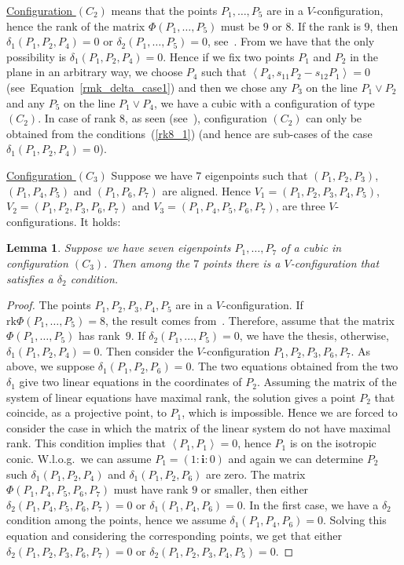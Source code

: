 \documentclass{amsart}
\theoremstyle{plain}
\newtheorem{lemma}{Lemma}[section]
\theoremstyle{definition}
\newcommand{\scl}[2]{\left\langle {#1}, {#2} \right\rangle}
\newcommand{\iii}{\textbf{i}}
\newcommand{\rk}{\ensuremath{\mathrm{rk}}}
\begin{document}
\underline{Configuration $(C_2)$} means that the points
$P_1, \dots, P_5$ are in a
$V$-configuration, hence the rank of the matrix $\Phi(P_1, \dots, P_5)$
must be $9$ or $8$. If the rank is $9$, then $\delta_1(P_1, P_2, P_4) = 0$
or $\delta_2(P_1, \dots, P_5) = 0$, see~.
From  we have that the only possibility
is $\delta_1(P_1, P_2, P_4) = 0$. Hence if we fix two points $P_1$ and $P_2$
in the plane in an arbitrary way, we choose $P_4$ such that
$\scl{P_4}{s_{11}P_2-s_{12}P_1}=0$
(see~Equation~\eqref{rmk_delta_case1}) and then we chose any $P_3$
on the line $P_1\vee P_2$ and any $P_5$ on the line $P_1\vee P_4$, we have a cubic
with a configuration of type $(C_2)$. In case of rank $8$, as seen
(see~),
configuration $(C_2)$ can only be
obtained from the conditions~(\ref{rk8_1}) (and hence are sub-cases
of the case $\delta_1(P_1, P_2, P_4)=0$).

\underline{Configuration $(C_3)$} Suppose we have $7$ eigenpoints such that
$(P_1, P_2, P_3)$, $(P_1, P_4, P_5)$ and $(P_1, P_6, P_7)$ are
aligned. Hence
$V_1 = (P_1, P_2, P_3, P_4, P_5)$, $V_2 = (P_1, P_2, P_3, P_6, P_7)$ and
$V_3 = (P_1, P_4, P_5, P_6, P_7)$, are three $V$-configurations. It holds:

\begin{lemma}
\label{no_delta1_delta1} Suppose we have  seven eigenpoints $P_1, \dots, P_7$
of a cubic in configuration $(C_3)$. Then among the $7$ points there is a
$V$-configuration that satisfies a $\delta_2$ condition.
\end{lemma}
\begin{proof}
The points $P_1, P_2, P_3, P_4, P_5$ are in a $V$-configuration. If
$\rk \Phi(P_1, \dots, P_5) = 8$, the result comes from~.
Therefore, assume that the matrix $\Phi(P_1, \dots, P_5)$ has
rank~$9$. If
$\delta_2(P_1, \dots, P_5) = 0$, we have the thesis, otherwise,
$\delta_1(P_1, P_2, P_4) = 0$. Then consider the $V$-configuration
$P_1, P_2, P_3, P_6, P_7$. As above, we suppose $\delta_1(P_1, P_2, P_6) = 0$.
The two equations obtained from the two $\delta_1$ give two
linear equations in the coordinates
of $P_2$. Assuming the matrix of the system of linear equations have
maximal rank, the solution gives a point $P_2$ that coincide, as
a projective point, to $P_1$, which is impossible. Hence we are forced to
consider the
case in which the matrix of the linear system do not have maximal rank.
This condition implies that $\scl{P_1}{P_1} = 0$, hence $P_1$ is on the
isotropic conic. W.l.o.g.\ we can assume $P_1 = (1: \iii: 0)$ and again
we can determine $P_2$ such $\delta_1(P_1, P_2, P_4)$ and
$\delta_1(P_1, P_2, P_6)$ are zero. The matrix $\Phi(P_1, P_4, P_5, P_6, P_7)$
must have rank $9$ or smaller, then either
$\delta_2(P_1, P_4, P_5, P_6, P_7)=0$ or $\delta_1(P_1, P_4, P_6) = 0$. In
the first case, we have a $\delta_2$ condition among the points, hence
we assume $\delta_1(P_1, P_4, P_6) = 0$. Solving this equation and
considering the corresponding points, we get that either
$\delta_2(P_1, P_2, P_3, P_6, P_7) = 0$ or
$\delta_2(P_1, P_2, P_3, P_4, P_5) = 0$.
\end{proof}
\end{document}
